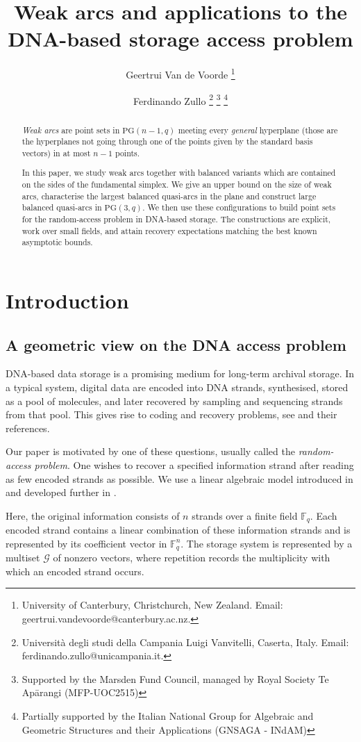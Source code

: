 \documentclass{article}
\title{Weak arcs and applications to the DNA-based storage access problem}
\author{Geertrui Van de Voorde 
\thanks{University of Canterbury, Christchurch, New Zealand. Email: geertrui.vandevoorde@canterbury.ac.nz.}
\footnotemark[3]
\and Ferdinando Zullo 
\thanks{Universit\`a degli studi della Campania Luigi Vanvitelli, Caserta, Italy.
Email: ferdinando.zullo@unicampania.it.}
\thanks{Supported by the Marsden Fund Council, managed by Royal Society Te Ap\={a}rangi (MFP-UOC2515)} 
\thanks{
Partially supported by the Italian National Group for Algebraic and Geometric Structures and their Applications (GNSAGA - INdAM)}}
\date{}
\newcommand{\PG}{\mathrm{PG}}
\begin{document}
\maketitle
\begin{abstract}
    {\em Weak arcs} are point sets in $\PG(n-1,q)$ meeting every {\em general} hyperplane (those are the hyperplanes not going through one of the points given by the standard basis vectors) in at most $n-1$ points. 
    
    In this paper, we study weak arcs together with balanced variants which are contained on the sides of the fundamental simplex. We give an upper bound on the size of weak arcs, characterise the largest balanced quasi-arcs in the plane and construct large balanced quasi-arcs in $\PG(3, q)$. We then use these configurations to build point sets for the random-access problem in DNA-based storage. The constructions are explicit, work over small fields, and attain recovery expectations matching the best known asymptotic bounds.
\end{abstract}
\section{Introduction}
\subsection{A geometric view on the DNA access problem}

DNA-based data storage is a promising medium for long-term archival storage. In a typical system, digital data are encoded into DNA strands, synthesised, stored as a pool of molecules, and later recovered by sampling and sequencing strands from that pool. This gives rise to coding and recovery problems, see \cite{YazdiEtAl2015,OrganickEtAl2018,BarLevSabaryGabrysYaakobi2025} and their references.

Our paper is motivated by one of these questions, usually called the \emph{random-access problem}. One wishes to recover a specified information strand after reading as few encoded strands as possible. We use a linear algebraic model introduced in \cite{GruicaBarLevRavagnaniYaakobi2025} and developed further in \cite{GruicaMontanucciZullo2026}.

Here, the original information consists of $n$ strands over a finite field $\mathbb F_q$. Each encoded strand contains a linear combination of these information strands and is represented by its coefficient vector in $\mathbb F_q^n$. The storage system is represented by a multiset $\mathcal G$ of nonzero vectors, where repetition records the multiplicity with which an encoded strand occurs. 
\end{document}
